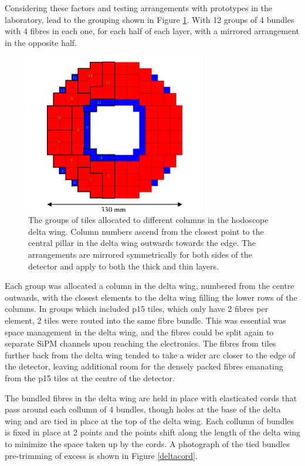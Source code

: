 Considering these factors and testing arrangements with prototypes in the laboratory, lead to the grouping shown in Figure \ref{FibreGrouping}. With 12 groups of 4 bundles with 4 fibres in each one, for each half of each layer, with a mirrored arrangement in the opposite half. 


\begin{figure}
	\centering
	\includegraphics[width=0.7\textwidth]{ImgChap1/groups}
	\caption{The groups of tiles allocated to different columns in the hodoscope delta wing. Column numbers ascend from the closest point to the central pillar in the delta wing outwards towards the edge. The arrangements are mirrored symmetrically for both sides of the detector and apply to both the thick and thin layers.}		
	\label{FibreGrouping}
\end{figure}

Each group was allocated a column in the delta wing, numbered from the centre outwards, with the closest elements to the delta wing filling the lower rows of the columns. In groups which included p15 tiles, which only have 2 fibres per element, 2 tiles were routed into the same fibre bundle. This was essential was space management in the delta wing, and the fibres could be split again to separate SiPM channels upon reaching the electronics. The fibres from tiles further back from the delta wing tended to take a wider arc closer to the edge of the detector, leaving additional room for the densely packed fibres emanating from the p15 tiles at the centre of the detector. 

The bundled fibres in the delta wing are held in place with elasticated cords that pass around each collumn of 4 bundles, though holes at the base of the delta wing and are tied in place at the top of the delta wing. Each collumn of bundles is fixed in place at 2 points and the points shift along the length of the delta wing to minimize the space taken up by the cords. A photograph of the tied bundles pre-trimming of excess is shown in Figure \ref{deltacord}.

